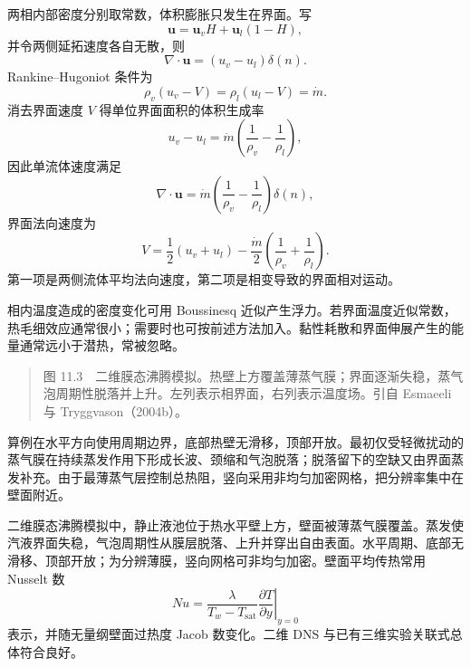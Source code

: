 \documentclass[11pt,a4paper,openany,fontset=none]{ctexbook}
\begin{document}
两相内部密度分别取常数，体积膨胀只发生在界面。写
\begin{equation*}
 \bm u=\bm u_vH+\bm u_l(1-H),
\end{equation*}
并令两侧延拓速度各自无散，则
\begin{equation}
 \nabla\cdot\bm u=(u_v-u_l)\delta(n). \tag{11.3}
\end{equation}
Rankine--Hugoniot 条件为
\begin{equation}
 \rho_v(u_v-V)=\rho_l(u_l-V)=\dot m. \tag{11.4}
\end{equation}
消去界面速度 $V$ 得单位界面面积的体积生成率
\begin{equation}
 u_v-u_l=\dot m\left(\frac1{\rho_v}-\frac1{\rho_l}\right), \tag{11.5}
\end{equation}
因此单流体速度满足
\begin{equation}
 \nabla\cdot\bm u=\dot m\left(\frac1{\rho_v}-\frac1{\rho_l}\right)\delta(n), \tag{11.6}
\end{equation}
界面法向速度为
\begin{equation}
 V=\frac12(u_v+u_l)-\frac{\dot m}{2}\left(\frac1{\rho_v}+\frac1{\rho_l}\right). \tag{11.7}
\end{equation}
第一项是两侧流体平均法向速度，第二项是相变导致的界面相对运动。

相内温度造成的密度变化可用 Boussinesq 近似产生浮力。若界面温度近似常数，热毛细效应通常很小；需要时也可按前述方法加入。黏性耗散和界面伸展产生的能量通常远小于潜热，常被忽略。

\begin{quote}\small 图 11.3　二维膜态沸腾模拟。热壁上方覆盖薄蒸气膜；界面逐渐失稳，蒸气泡周期性脱落并上升。左列表示相界面，右列表示温度场。引自 Esmaeeli 与 Tryggvason（2004b）。\end{quote}
算例在水平方向使用周期边界，底部热壁无滑移，顶部开放。最初仅受轻微扰动的蒸气膜在持续蒸发作用下形成长波、颈缩和气泡脱落；脱落留下的空缺又由界面蒸发补充。由于最薄蒸气层控制总热阻，竖向采用非均匀加密网格，把分辨率集中在壁面附近。

二维膜态沸腾模拟中，静止液池位于热水平壁上方，壁面被薄蒸气膜覆盖。蒸发使汽液界面失稳，气泡周期性从膜层脱落、上升并穿出自由表面。水平周期、底部无滑移、顶部开放；为分辨薄膜，竖向网格可非均匀加密。壁面平均传热常用 Nusselt 数
\begin{equation*}
 Nu=\left.\frac{\lambda}{T_w-T_{\mathrm{sat}}}\frac{\partial T}{\partial y}\right|_{y=0}
\end{equation*}
表示，并随无量纲壁面过热度 Jacob 数变化。二维 DNS 与已有三维实验关联式总体符合良好。
\end{document}
